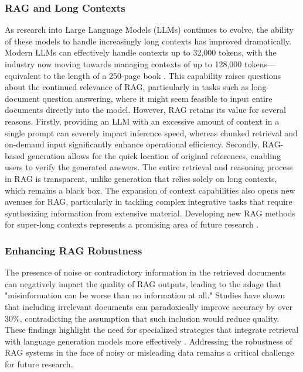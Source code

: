 \subsubsection{RAG and Long Contexts}

As research into Large Language Models (LLMs) continues to evolve, the ability of these models to handle increasingly long contexts has improved dramatically. Modern LLMs can effectively handle contexts up to 32,000 tokens, with the industry now moving towards managing contexts of up to 128,000 tokens—equivalent to the length of a 250-page book \cite{ibm2023}. This capability raises questions about the continued relevance of RAG, particularly in tasks such as long-document question answering, where it might seem feasible to input entire documents directly into the model. However, RAG retains its value for several reasons. Firstly, providing an LLM with an excessive amount of context in a single prompt can severely impact inference speed, whereas chunked retrieval and on-demand input significantly enhance operational efficiency. Secondly, RAG-based generation allows for the quick location of original references, enabling users to verify the generated answers. The entire retrieval and reasoning process in RAG is transparent, unlike generation that relies solely on long contexts, which remains a black box. The expansion of context capabilities also opens new avenues for RAG, particularly in tackling complex integrative tasks that require synthesizing information from extensive material. Developing new RAG methods for super-long contexts represents a promising area of future research \cite{gao2023retrieval}.

\subsubsection{Enhancing RAG Robustness}

The presence of noise or contradictory information in the retrieved documents can negatively impact the quality of RAG outputs, leading to the adage that "misinformation can be worse than no information at all." Studies have shown that including irrelevant documents can paradoxically improve accuracy by over 30\%, contradicting the assumption that such inclusion would reduce quality. These findings highlight the need for specialized strategies that integrate retrieval with language generation models more effectively \cite{cuconasu2024power}. Addressing the robustness of RAG systems in the face of noisy or misleading data remains a critical challenge for future research.

